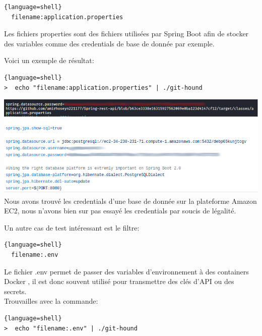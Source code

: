 \begin{lstlisting}{language=shell}
  filename:application.properties
\end{lstlisting}

Les fichiers properties sont des fichiers utilisées par Spring Boot afin de stocker des variables comme des credentials de base de donnée par exemple.

Voici un exemple de résultat: \\

\begin{lstlisting}{language=shell}
>  echo "filename:application.properties" | ./git-hound
\end{lstlisting}

\includegraphics[scale=0.48]{images/SEN_Projet_Image015.png} \\

\includegraphics[scale=0.48]{images/SEN_Projet_Image016.png} \\

Nous avons trouvé les credentials d'une base de donnée sur la plateforme Amazon EC2, nous n'avons bien sur pas essayé les credentials par soucis de légalité.

Un autre cas de test intéressant est le filtre:

\begin{lstlisting}{language=shell}
  filename:.env
\end{lstlisting}

Le fichier .env permet de passer des variables d'environnement à des containers Docker , il est donc souvent utilisé pour transmettre des clés d'API ou des secrets.
\\

Trouvailles avec la commande:

\begin{lstlisting}{language=shell}
>  echo "filename:.env" | ./git-hound
\end{lstlisting}

